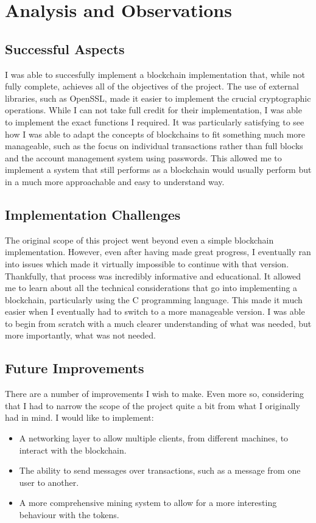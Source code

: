\documentclass[12pt]{article}
\begin{document}
\section{Analysis and Observations}

\subsection{Successful Aspects}
I was able to succesfully implement a blockchain implementation that, while not fully complete, achieves all of the objectives of the project. The use of external libraries, such as OpenSSL, made it easier to implement the crucial cryptographic operations. While I can not take full credit for their implementation, I was able to implement the exact functions I required. It was particularly satisfying to see how I was able to adapt the concepts of blockchains to fit something much more manageable, such as the focus on individual transactions rather than full blocks and the account management system using passwords. This allowed me to implement a system that still performs as a blockchain would usually perform but in a much more approachable and easy to understand way.

\subsection{Implementation Challenges}
The original scope of this project went beyond even a simple blockchain implementation. However, even after having made great progress, I eventually ran into issues which made it virtually impossible to continue with that version. Thankfully, that process was incredibly informative and educational. It allowed me to learn about all the technical considerations that go into implementing a blockchain, particularly using the C programming language. This made it much easier when I eventually had to switch to a more manageable version. I was able to begin from scratch with a much clearer understanding of what was needed, but more importantly, what was not needed.

\subsection{Future Improvements}
There are a number of improvements I wish to make. Even more so, considering that I had to narrow the scope of the project quite a bit from what I originally had in mind. I would like to implement:
\begin{itemize}
\item A networking layer to allow multiple clients, from different machines, to interact with the blockchain.
\item The ability to send messages over transactions, such as a message from one user to another.
\item A more comprehensive mining system to allow for a more interesting behaviour with the tokens.
\end{itemize}
\end{document}
